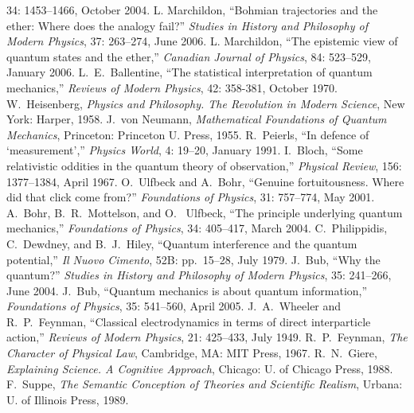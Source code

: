 \documentclass[12pt]{article}
\begin{document}
\begin{thebibliography}{99}
34: 1453--1466, October 2004.
%
 L. Marchildon,
``Bohmian trajectories and the ether: Where
does the analogy fail?''
\textit{Studies in History and Philosophy of
Modern Physics},
37: 263--274, June 2006.
%
 L. Marchildon,
``The epistemic view of quantum states and the ether,''
\textit{Canadian Journal of Physics},
84: 523--529, January 2006.
%
 L.~E.~Ballentine,
``The statistical interpretation of quantum mechanics,''
\textit{Reviews of Modern Physics},
42: 358-381, October 1970.
%
 W.~Heisenberg,
\textit{Physics and Philosophy.  The Revolution
in Modern Science},
New York: Harper, 1958.
%
 J.~von Neumann,
\textit{Mathematical Foundations of Quantum Mechanics},
Princeton: Princeton U. Press, 1955.
%
 R.~Peierls,
``In defence of `measurement',''
\textit{Physics World},
4: 19--20, January 1991.
%
 I.~Bloch,
``Some relativistic oddities in the quantum theory
of observation,''
\textit{Physical Review},
156: 1377--1384, April 1967.
%
 O.~Ulfbeck and A.~Bohr,
``Genuine fortuitousness.  Where did that click come from?''
\textit{Foundations of Physics},
31: 757--774, May 2001.
%
 A.~Bohr, B.~R.~Mottelson, and O.~ Ulfbeck,
``The principle underlying quantum mechanics,''
\textit{Foundations of Physics},
34: 405--417, March 2004.
%
 C.~Philippidis, C.~Dewdney, and B.~J.~Hiley,
``Quantum interference and the quantum potential,''
\textit{Il Nuovo Cimento}, 52B: pp.~15--28, July 1979.
%
 J.~Bub,
``Why the quantum?''
\textit{Studies in History and Philosophy of Modern Physics},
35: 241--266, June 2004.
%
 J.~Bub,
``Quantum mechanics is about quantum information,''
\textit{Foundations of Physics},
35: 541--560, April 2005.
%
 J.~A.~Wheeler and R.~P.~Feynman,
``Classical electrodynamics in terms of direct
interparticle action,''
\textit{Reviews of Modern Physics},
21: 425--433, July 1949.
%
 R.~P.~Feynman,
\textit{The Character of Physical Law},
Cambridge, MA: MIT Press, 1967.
%
 R.~N.~Giere,
\textit{Explaining Science.  A Cognitive Approach},
Chicago: U. of Chicago Press, 1988.
%
 F.~Suppe,
\textit{The Semantic Conception of Theories and
Scientific Realism},
Urbana: U. of Illinois Press, 1989.
%
\end{thebibliography}
%
\end{document}
